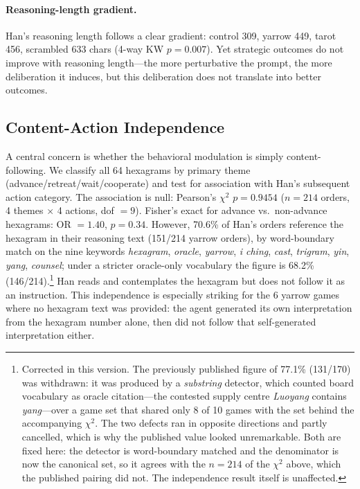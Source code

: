 \documentclass[11pt]{article}
\begin{document}
\paragraph{Reasoning-length gradient.} Han's reasoning length follows a clear gradient: control 309, yarrow 449, tarot 456, scrambled 633 chars (4-way KW $p = 0.007$). Yet strategic outcomes do not improve with reasoning length---the more perturbative the prompt, the more deliberation it induces, but this deliberation does not translate into better outcomes.

\subsection{Content-Action Independence}
\label{sec:content}

A central concern is whether the behavioral modulation is simply content-following. We classify all 64 hexagrams by primary theme (advance/retreat/wait/cooperate) and test for association with Han's subsequent action category. The association is null: Pearson's $\chi^2$ $p = 0.9454$ ($n = 214$ orders, 4 themes $\times$ 4 actions, dof $= 9$). Fisher's exact for advance vs.\ non-advance hexagrams: OR $= 1.40$, $p = 0.34$. However, 70.6\% of Han's orders reference the hexagram in their reasoning text (151/214 yarrow orders), by word-boundary match on the nine keywords \emph{hexagram}, \emph{oracle}, \emph{yarrow}, \emph{i ching}, \emph{cast}, \emph{trigram}, \emph{yin}, \emph{yang}, \emph{counsel}; under a stricter oracle-only vocabulary the figure is 68.2\% (146/214).\footnote{Corrected in this version. The previously published figure of 77.1\% (131/170) was withdrawn: it was produced by a \emph{substring} detector, which counted board vocabulary as oracle citation---the contested supply centre \emph{Luoyang} contains \emph{yang}---over a game set that shared only 8 of 10 games with the set behind the accompanying $\chi^2$. The two defects ran in opposite directions and partly cancelled, which is why the published value looked unremarkable. Both are fixed here: the detector is word-boundary matched and the denominator is now the canonical set, so it agrees with the $n = 214$ of the $\chi^2$ above, which the published pairing did not. The independence result itself is unaffected.} Han reads and contemplates the hexagram but does not follow it as an instruction. This independence is especially striking for the 6 yarrow games where no hexagram text was provided: the agent generated its own interpretation from the hexagram number alone, then did not follow that self-generated interpretation either.
\end{document}
